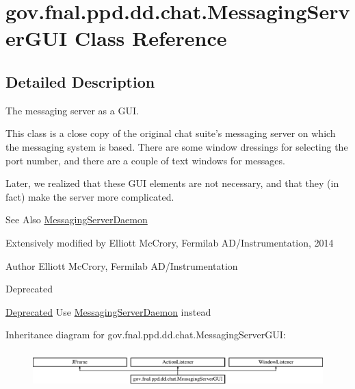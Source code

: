 \hypertarget{classgov_1_1fnal_1_1ppd_1_1dd_1_1chat_1_1MessagingServerGUI}{\section{gov.\-fnal.\-ppd.\-dd.\-chat.\-Messaging\-Server\-G\-U\-I Class Reference}
\label{classgov_1_1fnal_1_1ppd_1_1dd_1_1chat_1_1MessagingServerGUI}
}


\subsection{Detailed Description}
The messaging server as a G\-U\-I. 

This class is a close copy of the original chat suite's messaging server on which the messaging system is based. There are some window dressings for selecting the port number, and there are a couple of text windows for messages. 

Later, we realized that these G\-U\-I elements are not necessary, and that they (in fact) make the server more complicated. 

\begin{DoxySeeAlso}{See Also}
\hyperlink{classgov_1_1fnal_1_1ppd_1_1dd_1_1chat_1_1MessagingServerDaemon}{Messaging\-Server\-Daemon} 
\end{DoxySeeAlso}
Extensively modified by Elliott Mc\-Crory, Fermilab A\-D/\-Instrumentation, 2014 

\begin{DoxyAuthor}{Author}
Elliott Mc\-Crory, Fermilab A\-D/\-Instrumentation 
\end{DoxyAuthor}
\begin{DoxyRefDesc}{Deprecated}
\item[\hyperlink{deprecated__deprecated000001}{Deprecated}]Use \hyperlink{classgov_1_1fnal_1_1ppd_1_1dd_1_1chat_1_1MessagingServerDaemon}{Messaging\-Server\-Daemon} instead \end{DoxyRefDesc}
Inheritance diagram for gov.\-fnal.\-ppd.\-dd.\-chat.\-Messaging\-Server\-G\-U\-I\-:\begin{figure}[H]
\begin{center}
\leavevmode
\includegraphics[height=1.430396cm]{classgov_1_1fnal_1_1ppd_1_1dd_1_1chat_1_1MessagingServerGUI}
\end{center}
\end{figure}
